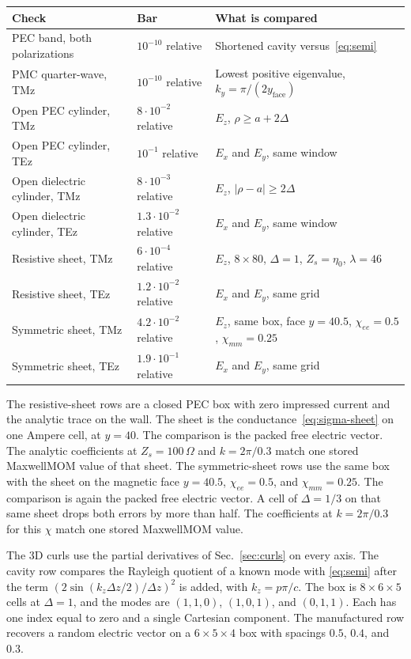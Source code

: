 \documentclass[11pt,a4paper]{article}
\numberwithin{equation}{section}
\begin{document}
\begin{center}
\small
\begin{tabular}{@{}>{\raggedright\arraybackslash}p{5.0cm}>{\raggedright\arraybackslash}p{3.5cm}>{\raggedright\arraybackslash}p{6.2cm}@{}}
\toprule
Check & Bar & What is compared\\
\midrule
PEC band, both polarizations & $10^{-10}$ relative & Shortened cavity versus~\eqref{eq:semi}\\
PMC quarter-wave, TMz & $10^{-10}$ relative & Lowest positive eigenvalue, $k_y=\pi/(2y_{\mathrm{face}})$\\
Open PEC cylinder, TMz & $8\cdot 10^{-2}$ relative & $E_z$, $\rho\ge a+2\Delta$\\
Open PEC cylinder, TEz & $10^{-1}$ relative & $E_x$ and $E_y$, same window\\
Open dielectric cylinder, TMz & $8\cdot 10^{-3}$ relative & $E_z$, $|\rho-a|\ge 2\Delta$\\
Open dielectric cylinder, TEz & $1.3\cdot 10^{-2}$ relative & $E_x$ and $E_y$, same window\\
Resistive sheet, TMz & $6\cdot 10^{-4}$ relative & $E_z$, $8\times 80$, $\Delta=1$, $Z_s=\eta_0$, $\lambda=46$\\
Resistive sheet, TEz & $1.2\cdot 10^{-2}$ relative & $E_x$ and $E_y$, same grid\\
Symmetric sheet, TMz & $4.2\cdot 10^{-2}$ relative & $E_z$, same box, face $y=40.5$, $\chi_{ee}=0.5$, $\chi_{mm}=0.25$\\
Symmetric sheet, TEz & $1.9\cdot 10^{-1}$ relative & $E_x$ and $E_y$, same grid\\
\bottomrule
\end{tabular}
\end{center}

The resistive-sheet rows are a closed PEC box with zero impressed current
and the analytic trace on the wall. The sheet is the
conductance~\eqref{eq:sigma-sheet} on one Ampere cell, at $y=40$. The
comparison is the packed free electric vector. The analytic coefficients
at $Z_s=100\,\Omega$ and $k=2\pi/0.3$ match one stored MaxwellMOM value of
that sheet. The symmetric-sheet rows use the same box with the sheet on
the magnetic face $y=40.5$, $\chi_{ee}=0.5$, and $\chi_{mm}=0.25$. The
comparison is again the packed free electric vector. A cell of $\Delta=1/3$
on that same sheet drops both errors by more than half. The coefficients
at $k=2\pi/0.3$ for this $\chi$ match one stored MaxwellMOM value.

The 3D curls use the partial derivatives of Sec.~\ref{sec:curls} on every
axis. The cavity row compares the Rayleigh quotient of a known mode with
\eqref{eq:semi} after the term $(2\sin(k_z\Delta z/2)/\Delta z)^2$ is
added, with $k_z=p\pi/c$. The box is $8\times 6\times 5$ cells at
$\Delta=1$, and the modes are $(1,1,0)$, $(1,0,1)$, and $(0,1,1)$. Each
has one index equal to zero and a single Cartesian component. The
manufactured row recovers a random electric vector on a $6\times 5\times 4$
box with spacings $0.5$, $0.4$, and $0.3$.
\end{document}
